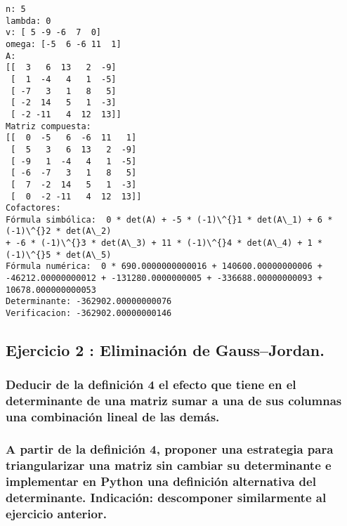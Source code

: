 \documentclass[11pt]{article}
\begin{document}
    \begin{Verbatim}[commandchars=\\\{\}]
n: 5
lambda: 0
v: [ 5 -9 -6  7  0]
omega: [-5  6 -6 11  1]
A:
[[  3   6  13   2  -9]
 [  1  -4   4   1  -5]
 [ -7   3   1   8   5]
 [ -2  14   5   1  -3]
 [ -2 -11   4  12  13]]
Matriz compuesta:
[[  0  -5   6  -6  11   1]
 [  5   3   6  13   2  -9]
 [ -9   1  -4   4   1  -5]
 [ -6  -7   3   1   8   5]
 [  7  -2  14   5   1  -3]
 [  0  -2 -11   4  12  13]]
Cofactores:
Fórmula simbólica:  0 * det(A) + -5 * (-1)\^{}1 * det(A\_1) + 6 * (-1)\^{}2 * det(A\_2)
+ -6 * (-1)\^{}3 * det(A\_3) + 11 * (-1)\^{}4 * det(A\_4) + 1 * (-1)\^{}5 * det(A\_5)
Fórmula numérica:  0 * 690.0000000000016 + 140600.00000000006 +
-46212.00000000012 + -131280.0000000005 + -336688.00000000093 +
10678.000000000053
Determinante: -362902.00000000076
Verificacion: -362902.00000000146
    \end{Verbatim}

    \subsection{Ejercicio 2 : Eliminación de
Gauss--Jordan.}\label{ejercicio-2-eliminaciuxf3n-de-gaussjordan.}

\subsubsection{Deducir de la definición 4 el efecto que tiene en el
determinante de una matriz sumar a una de sus columnas una combinación
lineal de las
demás.}\label{deducir-de-la-definiciuxf3n-4-el-efecto-que-tiene-en-el-determinante-de-una-matriz-sumar-a-una-de-sus-columnas-una-combinaciuxf3n-lineal-de-las-demuxe1s.}

    

    \subsubsection{A partir de la definición 4, proponer una estrategia para
triangularizar una matriz sin cambiar su determinante e implementar en
Python una definición alternativa del determinante. Indicación:
descomponer similarmente al ejercicio
anterior.}\label{a-partir-de-la-definiciuxf3n-4-proponer-una-estrategia-para-triangularizar-una-matriz-sin-cambiar-su-determinante-e-implementar-en-python-una-definiciuxf3n-alternativa-del-determinante.-indicaciuxf3n-descomponer-similarmente-al-ejercicio-anterior.}

    
\end{document}
